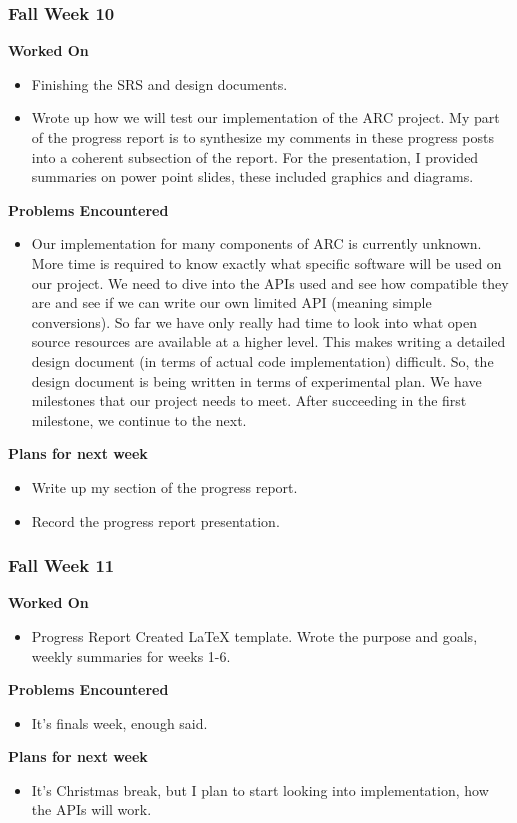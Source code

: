 \documentclass[compsoc,draftclsnofoot,onecolumn,10pt]{IEEEtran}
\begin{document}
\subsubsection*{Fall Week 10}

\textbf{Worked On}
\begin{itemize}
    \item Finishing the SRS and design documents.
    \item Wrote up how we will test our implementation of the ARC project.
    My part of the progress report is to synthesize my comments in these progress posts into a coherent subsection of the report.
    For the presentation, I provided summaries on power point slides, these included graphics and diagrams.
\end{itemize}
\textbf{Problems Encountered}
\begin{itemize}
    \item Our implementation for many components of ARC is currently unknown. More time is required to know exactly what specific software will be used on our project. We need to dive into the APIs used and see how compatible they are and see if we can write our own limited API (meaning simple conversions). So far we have only really had time to look into what open source resources are available at a higher level. This makes writing a detailed design document (in terms of actual code implementation) difficult. So, the design document is being written in terms of experimental plan. We have milestones that our project needs to meet. After succeeding in the first milestone, we continue to the next.
\end{itemize}
\textbf{Plans for next week}
\begin{itemize}
    \item Write up my section of the progress report.
    \item Record the progress report presentation.
\end{itemize}


\subsubsection*{Fall Week 11}
\textbf{Worked On}
\begin{itemize}
    \item Progress Report
    Created LaTeX template.
    Wrote the purpose and goals, weekly summaries for weeks 1-6.
\end{itemize}
\textbf{Problems Encountered}
\begin{itemize}
    \item It's finals week, enough said.
\end{itemize}
\textbf{Plans for next week}
\begin{itemize}
    \item It's Christmas break, but I plan to start looking into implementation, how the APIs will work.
\end{itemize}
\end{document}
